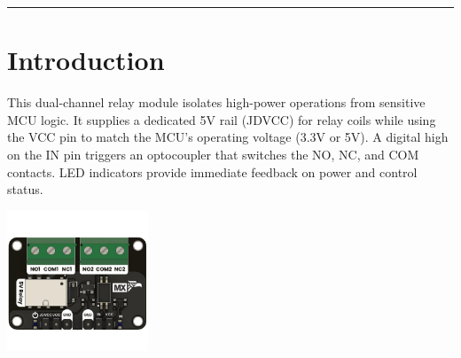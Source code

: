 \documentclass[10pt]{article}
\title{}
\author{}
\date{}
\begin{document}
\noindent
{}
\vspace{1em}
\hrule
\vspace{1.5em}

\section*{Introduction}
\vspace{0.5em}
\noindent
\begin{minipage}[t]{0.62\textwidth}
\setlength{\parskip}{0.75em}
\justifying
This dual-channel relay module isolates high-power operations from sensitive MCU logic. It supplies a dedicated 5V rail (JDVCC) for relay coils while using the VCC pin to match the MCU’s operating voltage (3.3V or 5V). A digital high on the IN pin triggers an optocoupler that switches the NO, NC, and COM contacts. LED indicators provide immediate feedback on power and control status.
\end{minipage}
\hfill
\begin{minipage}[t]{0.35\textwidth}
\centering
\vspace{-0.5em}
\includegraphics[height=4.2cm,keepaspectratio]{../../hardware/resources/img/relay_module.png}
\end{minipage}

\vspace{1.0em}
\FloatBarrier %



\end{document}
